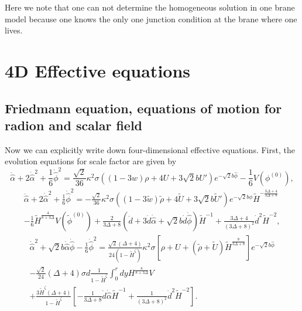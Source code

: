 \documentclass[a4paper,11pt]{article}
\begin{document}
Here we note that one can not determine the homogeneous solution in 
one brane model because one knows the only one junction condition at 
the brane where one lives.  

\section{4D Effective equations}
\subsection{Friedmann equation, equations of motion for radion and 
scalar field}

Now we can explicitly write down four-dimensional effective equations. 
First, the evolution equations for scale factor are given by
\begin{equation} 
\ddot{\hat{\alpha}}+2\dot{\hat{\alpha}}^2 
+\frac{1}{6}\dot{\hat{\phi}}^2
= \frac{\sqrt{2}}{36} \kappa^2 \sigma 
((1-3w)\rho+4 U+3 \sqrt{2} b U')e^{-\sqrt{2}b \hat{\phi}} -
\frac{1}{6} V(\phi^{(0)}), 
\label{eq:Friedmann1} 
\end{equation} 
\begin{multline}
\ddot{\hat{\alpha}}+2\dot{\hat{\alpha}}^2 
+\frac{1}{6}\dot{\hat{\phi}}^2  
= -\frac{\sqrt{2}}{36}\kappa^2 \sigma
((1-3\tilde{w})\tilde{\rho}+4 \tilde{U}+3 \sqrt{2} b \tilde{U}')
e^{-\sqrt{2}b\phi}
\tilde{H}^{-\frac{3\Delta +4}{3\Delta +8}}  \\
-\frac{1}{6}\tilde{H}^{\frac{4}{8+3 \Delta}}V(\tilde{\phi}^{(0)})  
 + \frac{2}{3\Delta +8}
\left(
\ddot{d} +3 \dot{d}\dot{\hat{\alpha}}
+\sqrt{2}b\dot{d}\dot{\hat{\phi}}
\right)
\tilde{H}^{-1}
+\frac{3\Delta +4}{(3\Delta +8)^2}\dot{d}^2\tilde{H}^{-2}, 
\label{eq:Friedmann2}
\end{multline}
\begin{multline}
\dot{\hat{\alpha}}^2+\sqrt{2} b \dot{\hat{\alpha}}\dot{\hat{\phi}}
-\frac{1}{6}\dot{\hat{\phi}}^2  
= \frac{\sqrt{2}(\Delta + 4)}{24(1-\tilde{H}^{\zeta})} \kappa^2 \sigma
\left[
\rho+U + (\tilde{\rho} + \tilde{U} )\tilde{H}^{\frac{8}{3\Delta +8}}
\right]
e^{-\sqrt{2}b\hat{\phi}}  \\
-\frac{\sqrt{2}}{24}(\Delta+4)\sigma d 
\frac{1}{1-\tilde{H}^{\zeta}} \int^{r}_0 dy H^{\frac{8}{8+3 \Delta}}
V \\
+\frac{3\tilde{H}^{\zeta}(\Delta +4)}{1-\tilde{H}^{\zeta}}
\left[
-\frac{1}{3\Delta +8}\dot{d}\dot{\hat{\alpha}}\tilde{H}^{-1}
+\frac{1}{(3\Delta +8)^2}\dot{d}^2 \tilde{H}^{-2}
\right].
\label{eq:1st-order (tt)2}
\end{multline}
\end{document}
